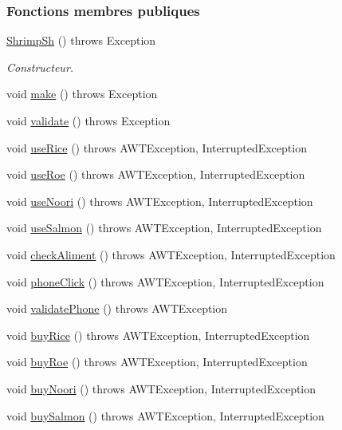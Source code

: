 \subsubsection*{Fonctions membres publiques}
\begin{DoxyCompactItemize}
\item 
\hyperlink{classSuchi_1_1ShrimpSh_a490f9be1d3f635955c56084a4abc0a04}{Shrimp\+Sh} ()  throws Exception 
\begin{DoxyCompactList}\small\item\em Constructeur. \end{DoxyCompactList}\item 
void \hyperlink{classSuchi_1_1ShrimpSh_a35c10dfd22125482b04f166ac1d5d742}{make} ()  throws Exception
\item 
void \hyperlink{classSuchi_1_1ShrimpSh_a0b7364be4569f257619596c06eefcb0a}{validate} ()  throws Exception 
\item 
void \hyperlink{classSuchi_1_1Recette_aa5204bd305d5029631ff4b8be9def83e}{use\+Rice} ()  throws A\+W\+T\+Exception, Interrupted\+Exception
\item 
void \hyperlink{classSuchi_1_1Recette_a500a2584148f1f08a1c7cdf7424e9a9c}{use\+Roe} ()  throws A\+W\+T\+Exception, Interrupted\+Exception
\item 
void \hyperlink{classSuchi_1_1Recette_a17d14fe05c28a44768d91e577e9bc511}{use\+Noori} ()  throws A\+W\+T\+Exception, Interrupted\+Exception
\item 
void \hyperlink{classSuchi_1_1Recette_a0fc2aa67439d0822762548c49cb29dec}{use\+Salmon} ()  throws A\+W\+T\+Exception, Interrupted\+Exception
\item 
void \hyperlink{classSuchi_1_1Recette_adc00873c980219a9a3fa7eddeaea3253}{check\+Aliment} ()  throws A\+W\+T\+Exception, Interrupted\+Exception
\item 
void \hyperlink{classSuchi_1_1Recette_a3e4c1e285cd28d0f2f2d364ea637c165}{phone\+Click} ()  throws A\+W\+T\+Exception, Interrupted\+Exception
\item 
void \hyperlink{classSuchi_1_1Recette_aae633102735c0f0a23f0aa84a0366fb3}{validate\+Phone} ()  throws A\+W\+T\+Exception
\item 
void \hyperlink{classSuchi_1_1Recette_a6e0c330317a6f65f2961d35f262362e7}{buy\+Rice} ()  throws A\+W\+T\+Exception, Interrupted\+Exception
\item 
void \hyperlink{classSuchi_1_1Recette_a019d29ed18bfa21dd4bf2ec681761fbf}{buy\+Roe} ()  throws A\+W\+T\+Exception, Interrupted\+Exception
\item 
void \hyperlink{classSuchi_1_1Recette_a31ee8b7bb1aeb396895509a5d5dea094}{buy\+Noori} ()  throws A\+W\+T\+Exception, Interrupted\+Exception
\item 
void \hyperlink{classSuchi_1_1Recette_aef0e38b7827110dbb4fd6a70777cddc1}{buy\+Salmon} ()  throws A\+W\+T\+Exception, Interrupted\+Exception
\end{DoxyCompactItemize}
